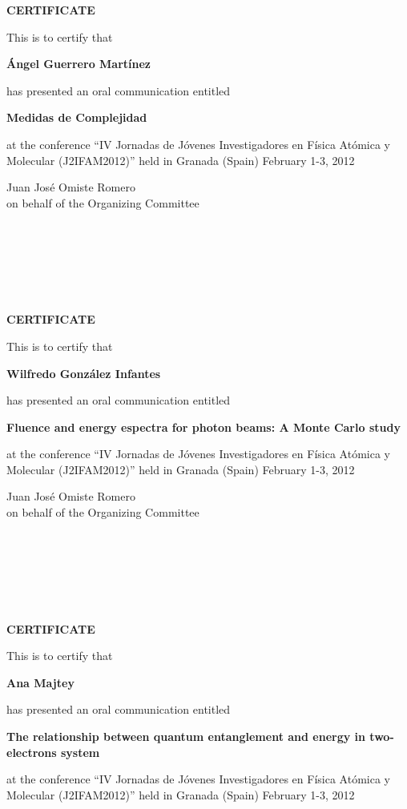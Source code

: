 \documentclass [13pt,a4paper] {letter}
\begin{document}
\pagestyle{empty}
\begin{center}
{\bf {\Huge CERTIFICATE}}

\vspace {1.5cm}
This is to certify that
\vspace {1cm}

{\bf \Large  Ángel    Guerrero Martínez }
\vspace {1cm}

has presented an oral communication entitled
\vspace {1cm}

{\bf \large  Medidas de Complejidad }
\vspace {1cm}

at the conference { \textquotedblleft IV Jornadas de Jóvenes Investigadores en Física Atómica y Molecular (J2IFAM2012)\textquotedblright} 
held in Granada (Spain) February 1-3, 2012
\end{center}
\vspace {3cm}
\begin{raggedleft}
Juan José Omiste Romero\\
on behalf of the Organizing Committee
\newpage
\end{raggedleft}
\begin{verbatim}






\end{verbatim}
\pagestyle{empty}
\begin{center}
{\bf {\Huge CERTIFICATE}}

\vspace {1.5cm}
This is to certify that
\vspace {1cm}

{\bf \Large  Wilfredo    González Infantes }
\vspace {1cm}

has presented an oral communication entitled
\vspace {1cm}

{\bf \large  Fluence and energy espectra for photon beams: A Monte Carlo study }
\vspace {1cm}

at the conference { \textquotedblleft IV Jornadas de Jóvenes Investigadores en Física Atómica y Molecular (J2IFAM2012)\textquotedblright} 
held in Granada (Spain) February 1-3, 2012
\end{center}
\vspace {3cm}
\begin{raggedleft}
Juan José Omiste Romero\\
on behalf of the Organizing Committee
\newpage
\end{raggedleft}
\begin{verbatim}






\end{verbatim}
\pagestyle{empty}
\begin{center}
{\bf {\Huge CERTIFICATE}}

\vspace {1.5cm}
This is to certify that
\vspace {1cm}

{\bf \Large  Ana    Majtey }
\vspace {1cm}

has presented an oral communication entitled
\vspace {1cm}

{\bf \large  The relationship between quantum entanglement and energy in two-electrons system }
\vspace {1cm}

at the conference { \textquotedblleft IV Jornadas de Jóvenes Investigadores en Física Atómica y Molecular (J2IFAM2012)\textquotedblright} 
held in Granada (Spain) February 1-3, 2012
\end{center}
\end{document}
